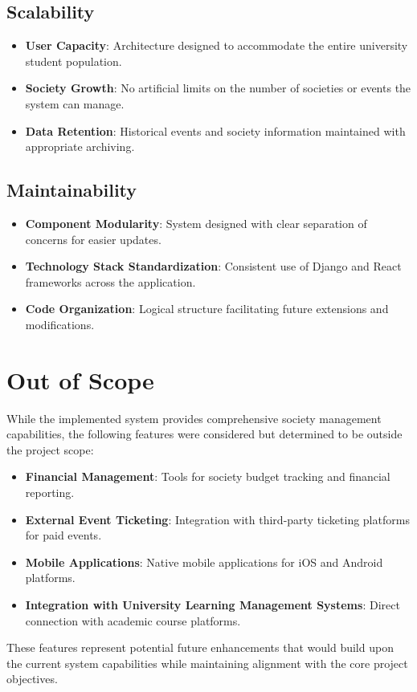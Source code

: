 \subsection{Scalability}
\begin{itemize}
    \item \textbf{User Capacity}: Architecture designed to accommodate the entire university student population.
    \item \textbf{Society Growth}: No artificial limits on the number of societies or events the system can manage.
    \item \textbf{Data Retention}: Historical events and society information maintained with appropriate archiving.
\end{itemize}

\subsection{Maintainability}
\begin{itemize}
    \item \textbf{Component Modularity}: System designed with clear separation of concerns for easier updates.
    \item \textbf{Technology Stack Standardization}: Consistent use of Django and React frameworks across the application.
    \item \textbf{Code Organization}: Logical structure facilitating future extensions and modifications.
\end{itemize}

\section{Out of Scope}
While the implemented system provides comprehensive society management capabilities, the following features were considered but determined to be outside the project scope:

\begin{itemize}
    \item \textbf{Financial Management}: Tools for society budget tracking and financial reporting.
    \item \textbf{External Event Ticketing}: Integration with third-party ticketing platforms for paid events.
    \item \textbf{Mobile Applications}: Native mobile applications for iOS and Android platforms.
    \item \textbf{Integration with University Learning Management Systems}: Direct connection with academic course platforms.
\end{itemize}

These features represent potential future enhancements that would build upon the current system capabilities while maintaining alignment with the core project objectives.